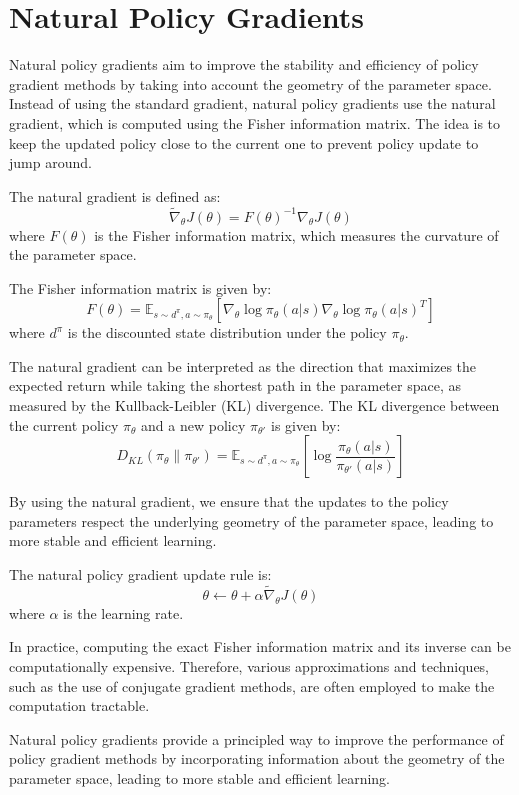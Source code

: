 \documentclass[12pt]{article}
\begin{document}
\section{Natural Policy Gradients}

Natural policy gradients aim to improve the stability and efficiency of policy gradient methods by taking into account the geometry of the parameter space. Instead of using the standard gradient, natural policy gradients use the natural gradient, which is computed using the Fisher information matrix. The idea is to keep the updated policy close to the current one to prevent policy update to jump around. 

The natural gradient is defined as:
\[ 
\tilde{\nabla}_\theta J(\theta) = F(\theta)^{-1} \nabla_\theta J(\theta) 
\]
where \( F(\theta) \) is the Fisher information matrix, which measures the curvature of the parameter space.

The Fisher information matrix is given by:
\[ 
F(\theta) = \mathbb{E}_{s \sim d^\pi, a \sim \pi_\theta} \left[ \nabla_\theta \log \pi_\theta(a | s) \nabla_\theta \log \pi_\theta(a | s)^T \right] 
\]
where \( d^\pi \) is the discounted state distribution under the policy \( \pi_\theta \).

The natural gradient can be interpreted as the direction that maximizes the expected return while taking the shortest path in the parameter space, as measured by the Kullback-Leibler (KL) divergence. The KL divergence between the current policy \( \pi_\theta \) and a new policy \( \pi_{\theta'} \) is given by:
\[ 
D_{KL}(\pi_\theta \| \pi_{\theta'}) = \mathbb{E}_{s \sim d^\pi, a \sim \pi_\theta} \left[ \log \frac{\pi_\theta(a | s)}{\pi_{\theta'}(a | s)} \right] 
\]

By using the natural gradient, we ensure that the updates to the policy parameters respect the underlying geometry of the parameter space, leading to more stable and efficient learning.

The natural policy gradient update rule is:
\[ 
\theta \leftarrow \theta + \alpha \tilde{\nabla}_\theta J(\theta) 
\]
where \( \alpha \) is the learning rate.

In practice, computing the exact Fisher information matrix and its inverse can be computationally expensive. Therefore, various approximations and techniques, such as the use of conjugate gradient methods, are often employed to make the computation tractable.

Natural policy gradients provide a principled way to improve the performance of policy gradient methods by incorporating information about the geometry of the parameter space, leading to more stable and efficient learning.
\end{document}
